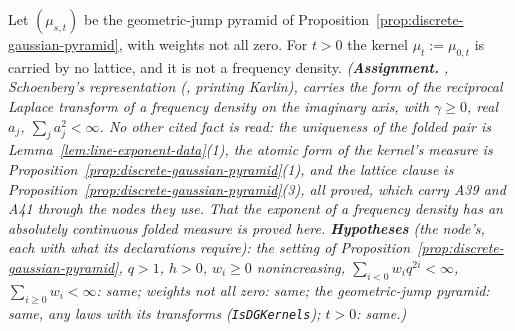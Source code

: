 \begin{proposition}
\label{prop:classical-pyramids-approximate-discrete-gaussian}
\leanok
Let $(\mu_{s,t})$ be the geometric-jump pyramid of Proposition~\ref{prop:discrete-gaussian-pyramid},
with weights not all zero. For $t > 0$ the kernel $\mu_t := \mu_{0,t}$ is carried by no lattice, and
it is not a \Polya{} frequency density.
\statusA\quad{}\quad\emph{(\textbf{Assignment.} ,
Schoenberg's representation (, printing Karlin), carries
the form of the reciprocal Laplace transform of a \Polya{} frequency density on the imaginary axis,
with $\gamma \ge 0$, real $a_j$, $\sum_ja_j^2 < \infty$. No other cited fact is read: the
uniqueness of the folded pair is Lemma~\ref{lem:line-exponent-data}(1), the atomic form of the
kernel's \Levy{} measure is Proposition~\ref{prop:discrete-gaussian-pyramid}(1), and the lattice
clause is Proposition~\ref{prop:discrete-gaussian-pyramid}(3), all proved, which carry A39 and A41
through the nodes they use. That the exponent of a \Polya{} frequency density has an absolutely
continuous folded \Levy{} measure is proved here. \textbf{Hypotheses} (the node's, each with what
its declarations require): the setting of Proposition~\ref{prop:discrete-gaussian-pyramid}, $q > 1$,
$h > 0$, $w_i \ge 0$ nonincreasing, $\sum_{i < 0}w_iq^{2i} < \infty$, $\sum_{i \ge 0}w_i < \infty$:
same; weights not all zero: same; the geometric-jump pyramid: same, any laws with its transforms
(\texttt{IsDGKernels}); $t > 0$: same.)}
\end{proposition}

